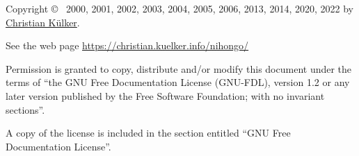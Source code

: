 \footnotesize

Copyright \copyright~ 2000, 2001, 2002, 2003, 2004, 2005, 2006, 2013, 2014,
2020, 2022 by
\href{mailto:christian.kuelker@cipworx.org}{Christian K\"ulker}.

\medskip

See the web page
\href{https://christian.kuelker.info/nihongo/}{https://christian.kuelker.info/nihongo/}


Permission is granted to copy, distribute and/or modify this document under the
terms of “the GNU Free Documentation License (GNU-FDL), version 1.2 or any
later version published by the Free Software Foundation; with no invariant
sections”.

A copy of the license is included in the section entitled “GNU Free
Documentation License”.

\normalsize

